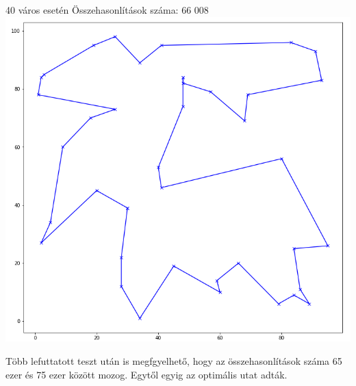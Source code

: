 40 város esetén
Összehasonlítások száma: 66 008
\includegraphics[scale=0.4]{images/40.png}

Több lefuttatott teszt után is megfgyelhető, hogy az összehasonlítások száma 65 ezer és 75 ezer között mozog. Egytől egyig az optimális utat adták.
